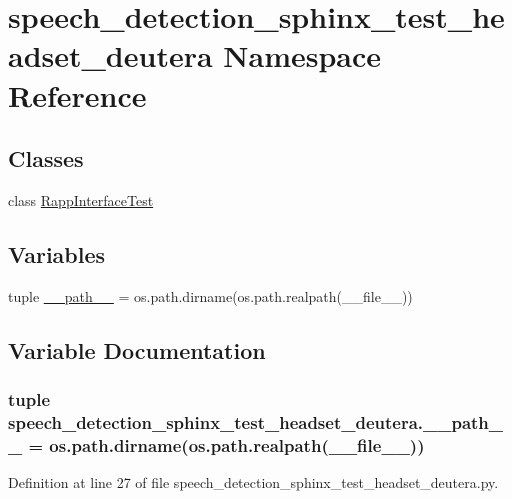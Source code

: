 \hypertarget{namespacespeech__detection__sphinx__test__headset__deutera}{\section{speech\-\_\-detection\-\_\-sphinx\-\_\-test\-\_\-headset\-\_\-deutera Namespace Reference}
\label{namespacespeech__detection__sphinx__test__headset__deutera}
}
\subsection*{Classes}
\begin{DoxyCompactItemize}
\item 
class \hyperlink{classspeech__detection__sphinx__test__headset__deutera_1_1RappInterfaceTest}{Rapp\-Interface\-Test}
\end{DoxyCompactItemize}
\subsection*{Variables}
\begin{DoxyCompactItemize}
\item 
tuple \hyperlink{namespacespeech__detection__sphinx__test__headset__deutera_a2b33ffb85d957835881d6183d0e9902e}{\-\_\-\-\_\-path\-\_\-\-\_\-} = os.\-path.\-dirname(os.\-path.\-realpath(\-\_\-\-\_\-file\-\_\-\-\_\-))
\end{DoxyCompactItemize}


\subsection{Variable Documentation}
\hypertarget{namespacespeech__detection__sphinx__test__headset__deutera_a2b33ffb85d957835881d6183d0e9902e}{
\subsubsection[{\-\_\-\-\_\-path\-\_\-\-\_\-}]{\setlength{\rightskip}{0pt plus 5cm}tuple speech\-\_\-detection\-\_\-sphinx\-\_\-test\-\_\-headset\-\_\-deutera.\-\_\-\-\_\-path\-\_\-\-\_\- = os.\-path.\-dirname(os.\-path.\-realpath(\-\_\-\-\_\-file\-\_\-\-\_\-))}}\label{namespacespeech__detection__sphinx__test__headset__deutera_a2b33ffb85d957835881d6183d0e9902e}


Definition at line 27 of file speech\-\_\-detection\-\_\-sphinx\-\_\-test\-\_\-headset\-\_\-deutera.\-py.

